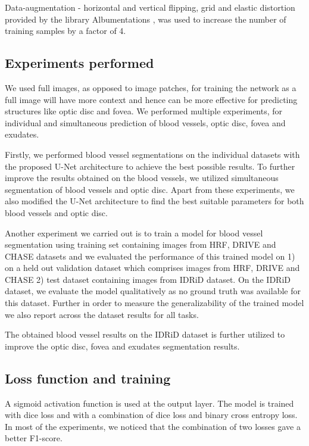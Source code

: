 \documentclass{article}
\begin{document}
Data-augmentation - horizontal and vertical flipping, grid and elastic distortion provided by the library Albumentations \cite{buslaev2020albumentations}, was used  to increase the number of training samples by a factor of 4.

\subsection{Experiments performed}
We used full images, as opposed to image patches, for training the network  as a full image will have more context and hence can be more effective for predicting structures like optic disc and fovea. We performed multiple experiments, for individual and simultaneous prediction of blood vessels, optic disc, fovea and exudates.

Firstly, we performed blood vessel segmentations on the individual datasets with the proposed U-Net architecture to achieve the best possible results. To further improve the results obtained on the blood vessels, we utilized simultaneous segmentation of blood vessels and optic disc. Apart from these experiments, we also modified the U-Net architecture to find the best suitable parameters for both blood vessels and optic disc.

Another experiment we carried out is to train a model for blood vessel segmentation using training set containing images from HRF, DRIVE and CHASE datasets and we evaluated the performance of this trained model on  1) on a held out validation dataset which comprises images from HRF, DRIVE and CHASE  2) test dataset containing images from IDRiD dataset. On the IDRiD dataset, we evaluate the model qualitatively as no ground truth was available for this dataset. Further in order to measure the generalizability of the trained model we also report across the dataset results for all tasks.

The obtained blood vessel results on the IDRiD dataset is further utilized to improve the optic disc, fovea and exudates segmentation results.



\subsection{Loss function and training}\label{sec:loss_and_training}
A sigmoid activation function is used at the output layer. The model is trained with dice loss and  with a combination of dice loss and binary cross entropy loss. In most of the experiments, we noticed that the combination of two losses gave a better F1-score.
\end{document}
